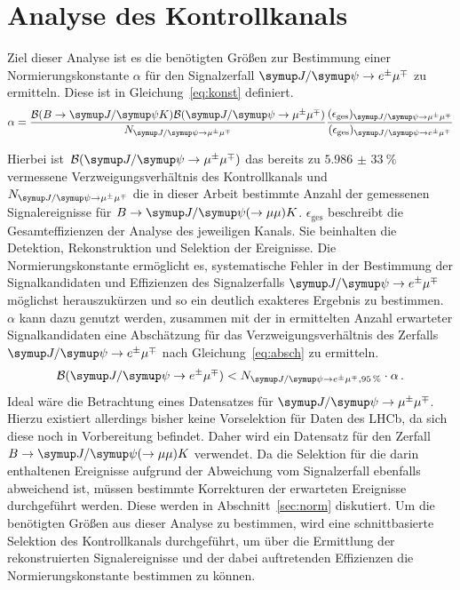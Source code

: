 \chapter{Analyse des Kontrollkanals}
\label{chap:4}
%
Ziel dieser Analyse ist es die benötigten Größen zur Bestimmung einer Normierungskonstante $\alpha$ für den Signalzerfall $\signal$ zu ermitteln. Diese ist in Gleichung~\eqref{eq:konst} definiert.
%
\begin{equation}
  \alpha=\frac{\mathcal{B}(B\rightarrow\jpsi K)\mathcal{B}(\kontroll)}{N_{\kontroll}}\frac{(\epsilon_{\text{ges}})_{\kontroll}}{(\epsilon_{\text{ges}})_{\signal}}
  \label{eq:konst}
\end{equation}
%

Hierbei ist~$\mathcal{B}(\kontroll)$ das bereits zu $\SI{5,986(33)}{\percent}$ \cite{pdg} vermessene Verzweigungsverhältnis des Kontrollkanals und~$N_{\kontroll}$ die in dieser Arbeit bestimmte Anzahl der gemessenen Signalereignisse für $B\rightarrow\jpsi(\rightarrow\mu\mu) K$.
$\epsilon_{\text{ges}}$ beschreibt die Gesamteffizienzen der Analyse des jeweiligen Kanals. Sie beinhalten die Detektion,
Rekonstruktion und Selektion der Ereignisse. Die Normierungskonstante ermöglicht es, systematische Fehler in der Bestimmung der
Signalkandidaten und Effizienzen des Signalzerfalls $\signal$ möglichst herauszukürzen und so ein deutlich exakteres Ergebnis
zu bestimmen. $\alpha$ kann dazu genutzt werden, zusammen mit der in \cite{ba-maik} ermittelten Anzahl erwarteter
Signalkandidaten eine Abschätzung für das Verzweigungsverhältnis des Zerfalls $\signal$ nach Gleichung~\eqref{eq:absch} zu ermitteln.
%
\begin{equation}
  \mathcal{B}(\signal)<N_{\signal, \SI{95}{\percent}}\cdot\alpha\, .
  \label{eq:absch}
\end{equation}
%
Ideal wäre die Betrachtung eines Datensatzes für $\kontroll$. Hierzu existiert allerdings bisher keine Vorselektion für Daten des LHCb, da sich diese noch in Vorbereitung befindet. Daher wird ein Datensatz für den Zerfall $B\rightarrow\jpsi(\rightarrow\mu\mu) K$ verwendet.
Da die Selektion für die darin enthaltenen Ereignisse aufgrund der Abweichung vom Signalzerfall ebenfalls abweichend ist, müssen bestimmte Korrekturen der erwarteten Ereignisse durchgeführt werden. Diese werden in Abschnitt~\ref{sec:norm} diskutiert.
Um die benötigten Größen aus dieser Analyse zu bestimmen, wird eine schnittbasierte Selektion des Kontrollkanals
durchgeführt, um über die Ermittlung der rekonstruierten Signalereignisse und der dabei auftretenden Effizienzen
die Normierungskonstante bestimmen zu können.
%
